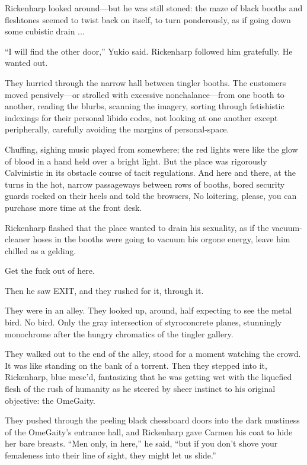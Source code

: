 Rickenharp looked around—but he was still stoned: the maze of black booths and fleshtones seemed to twist back on itself, to turn ponderously, as if going down some cubistic drain ...

``I will find the other door,'' Yukio said. Rickenharp followed him gratefully. He wanted out.

They hurried through the narrow hall between tingler booths. The customers moved pensively—or strolled with excessive nonchalance—from one booth to another, reading the blurbs, scanning the imagery, sorting through fetishistic indexings for their personal libido codes, not looking at one another except peripherally, carefully avoiding the margins of personal-space.

Chuffing, sighing music played from somewhere; the red lights were like the glow of blood in a hand held over a bright light. But the place was rigorously Calvinistic in its obstacle course of tacit regulations. And here and there, at the turns in the hot, narrow passageways between rows of booths, bored security guards rocked on their heels and told the browsers, No loitering, please, you can purchase more time at the front desk.

Rickenharp flashed that the place wanted to drain his sexuality, as if the vacuum-cleaner hoses in the booths were going to vacuum his orgone energy, leave him chilled as a gelding.

Get the fuck out of here.

Then he saw EXIT, and they rushed for it, through it.

They were in an alley. They looked up, around, half expecting to see the metal bird. No bird. Only the gray intersection of styroconcrete planes, stunningly monochrome after the hungry chromatics of the tingler gallery.

They walked out to the end of the alley, stood for a moment watching the crowd. It was like standing on the bank of a torrent. Then they stepped into it, Rickenharp, blue mesc'd, fantasizing that he was getting wet with the liquefied flesh of the rush of humanity as he steered by sheer instinct to his original objective: the OmeGaity.

They pushed through the peeling black chessboard doors into the dark mustiness of the OmeGaity's entrance hall, and Rickenharp gave Carmen his coat to hide her bare breasts. ``Men only, in here,'' he said, ``but if you don't shove your femaleness into their line of sight, they might let us slide.''

